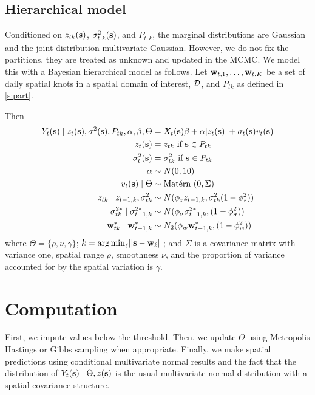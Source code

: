 \documentclass[11pt]{article}
\begin{document}
\subsection{Hierarchical model}\label{s:hier}
Conditioned on $z_{tk}(\mbox{\bf s})$, $\sigma^2_{t,k}(\mbox{\bf s})$, and $P_{t,k}$, the marginal distributions are Gaussian and the joint distribution multivariate Gaussian.
However, we do not fix the partitions, they are treated as unknown and updated in the MCMC.
We model this with a Bayesian hierarchical model as follows.
Let $\mbox{\bf w}_{t,1}, \ldots, \mbox{\bf w}_{t,K}$ be a set of daily spatial knots in a spatial domain of interest, ${\cal D}$, and $P_{tk}$ as defined in \ref{s:part}.

Then
\begin{align}
   Y_t(\mbox{\bf s}) \mid z_{t}(\mbox{\bf s}), \sigma^2(\mbox{\bf s}), P_{tk}, \alpha, \beta, \Theta &= X_t(\mbox{\bf s}) \beta + \alpha |z_t(\mbox{\bf s})| + \sigma_t(\mbox{\bf s}) v_t(\mbox{\bf s}) \label{eq:hier}\\
   z_t(\mbox{\bf s}) &= z_{tk} \text{ if } \mbox{\bf s} \in P_{tk}\\
   \sigma^2_{t}(\mbox{\bf s}) &= \sigma^2_{tk} \text{ if } \mbox{\bf s} \in P_{tk}\\
   \alpha &\sim N(0, 10)\\
   v_t(\mbox{\bf s}) \mid \Theta &\sim \mbox{Mat$\acute{\mbox{e}}$rn }(0, \Sigma)\\
   z_{tk} \mid z_{t-1, k}, \sigma^2_{tk} &\sim N(\phi_z z_{t-1, k}, \sigma^2_{tk} (1 - \phi_z^2))\\
   \sigma^{2*}_{tk} \mid \sigma^{2*}_{t-1, k} &\sim N(\phi_\sigma \sigma^{2*}_{t-1, k}, (1 - \phi_\sigma^2))\\
   \mbox{\bf w}^*_{tk} \mid \mbox{\bf w}^*_{t-1, k} &\sim N_2(\phi_w \mbox{\bf w}^*_{t-1, k}, (1 - \phi_w^2))
\end{align}
where $\Theta = \{\rho, \nu, \gamma\}$; \mbox{$k = {\mathop{\rm arg\, min}}_\ell ||\mbox{\bf s} - \mbox{\bf w}_\ell ||$}; and $\Sigma$ is a \Matern covariance matrix with variance one, spatial range $\rho$, smoothness $\nu$, and the proportion of variance accounted for by the spatial variation is $\gamma$.

\section{Computation}\label{s:comp}
First, we impute values below the threshold.
Then, we update $\Theta$ using Metropolis Hastings or Gibbs sampling when appropriate.
Finally, we make spatial predictions using conditional multivariate normal results and the fact that the distribution of $Y_t(\mbox{\bf s}) \mid \Theta, z(\mbox{\bf s})$ is the usual multivariate normal distribution with a \Matern spatial covariance structure.
\end{document}
